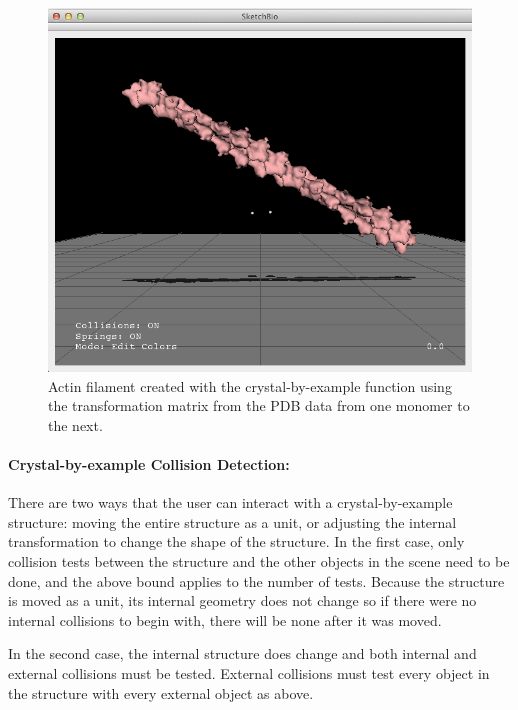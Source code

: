 \documentclass[twocolumn]{bmcart}%
\begin{document}
\begin{figure}[h]
\centering
\includegraphics[width=0.9\columnwidth]{crystal_actin.png}
\caption{Actin filament created with the crystal-by-example function using the transformation matrix from the PDB data from one monomer to the next.}
\label{fig:crystal_actin}
\end{figure}

\paragraph*{Crystal-by-example Collision Detection:}
There are two ways that the user can interact with a crystal-by-example structure: moving the entire structure as a unit, or adjusting the internal transformation to change the shape of the structure.
In the first case, only collision tests between the structure and the other objects in the scene need to be done, and the above bound applies to the number of tests.
Because the structure is moved as a unit, its internal geometry does not change so if there were no internal collisions to begin with, there will be none after it was moved. 


In the second case, the internal structure does change and both internal and external collisions must be tested.
External collisions must test every object in the structure with every external object as above.
\end{document}
